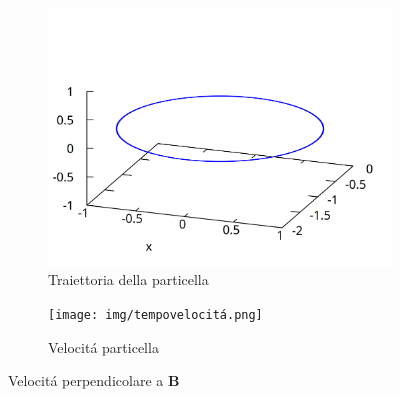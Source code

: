 \begin{figure}[ht]
\begin{subfigure}{.5\textwidth}
  \centering
  \includegraphics[width=.9\linewidth]{img/3dposizione.png}  
  \caption{Traiettoria della particella}
\end{subfigure}
\begin{subfigure}{.5\textwidth}
  \centering
  \texttt{[image: img/tempovelocitá.png]}  
  \caption{Velocitá particella}
\end{subfigure}
\caption{Velocitá perpendicolare a $\mathbf{B}$}
\end{figure}


